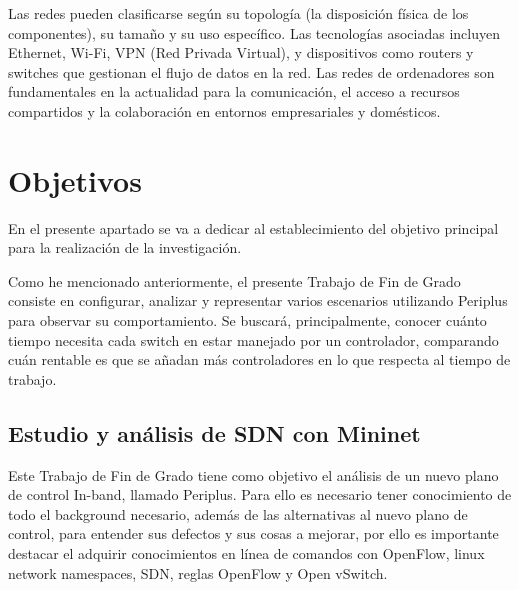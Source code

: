 \documentclass[a4paper, 12pt]{book}
\begin{document}
	Las redes pueden clasificarse según su topología (la disposición física de los componentes), su tamaño y su uso específico. Las tecnologías asociadas incluyen Ethernet, Wi-Fi, VPN (Red Privada Virtual), y dispositivos como routers y switches que gestionan el flujo de datos en la red. Las redes de ordenadores son fundamentales en la actualidad para la comunicación, el acceso a recursos compartidos y la colaboración en entornos empresariales y domésticos.
	
	
	\cleardoublepage %
	\chapter{Objetivos} %
	\label{chap:objetivos} %
	
	En el presente apartado se va a dedicar al establecimiento del objetivo principal para la realización de la investigación. 
	
	Como he mencionado anteriormente, el presente Trabajo de Fin de Grado consiste en configurar, analizar y representar varios escenarios utilizando Periplus para observar su comportamiento. Se buscará, principalmente, conocer cuánto tiempo necesita cada switch en estar manejado por un controlador, comparando cuán  rentable es que se añadan más controladores en lo que respecta al tiempo de trabajo.
	
	\section{Estudio y análisis de SDN con Mininet} %
	\label{sec:objetivo-mininet} %
	
	Este Trabajo de Fin de Grado tiene como objetivo el análisis de un nuevo plano de control In-band, llamado Periplus. Para ello es necesario tener conocimiento de todo el background necesario, además de las alternativas al nuevo plano de control, para entender sus defectos y sus cosas a mejorar, por ello es importante destacar el adquirir conocimientos en línea de comandos con OpenFlow, linux network namespaces, SDN, reglas OpenFlow y Open vSwitch.
	
\end{document}
